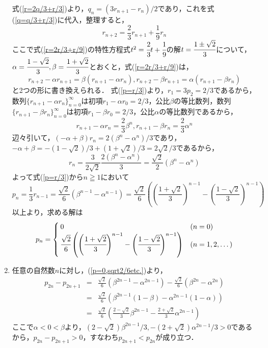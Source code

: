 \documentclass{jsarticle}
\begin{document}
\begin{enumerate}[(1)]
			式(\ref{r=2q/3+r/3})より，$q_n=(3r_{n+1}-r_n)/2$であり，これを式(\ref{q=q/3+r/3})に代入，整理すると，
			\begin{equation}
				\label{r=2r/3+r/9}
				r_{n+2}=\frac{2}{3}r_{n+1}+\frac{1}{9}r_n
			\end{equation}
			ここで式(\ref{r=2r/3+r/9})の特性方程式$t^2=\cfrac{2}{3}t+\cfrac{1}{9}$の解$t=\cfrac{1\pm \sqrt{2}}{3}$について，$\alpha=\cfrac{1-\sqrt{2}}{3},\beta=\cfrac{1+\sqrt{2}}{3}$とおくと，式(\ref{r=2r/3+r/9})は，
			\[
				r_{n+2}-\alpha r_{n+1}=\beta (r_{n+1}-\alpha r_n),
				r_{n+2}-\beta r_{n+1}=\alpha (r_{n+1}-\beta r_n)
			\]
			と2つの形に書き換えられる．
			式(\ref{p=r/3})より，$r_1=3p_2=2/3$であるから，数列$\{r_{n+1}-\alpha r_n\}_{n=0}^{\infty}$は初項$r_1-\alpha r_0=2/3$，公比$\beta$の等比数列，数列$\{r_{n+1}-\beta r_n\}_{n=0}^{\infty}$は初項$r_1-\beta r_0=2/3$，公比$\alpha$の等比数列であるから，
			\[
				r_{n+1}-\alpha r_n=\frac{2}{3}\beta^n,
				r_{n+1}-\beta r_n=\frac{2}{3}\alpha^n
			\]
			辺々引いて，$(-\alpha+\beta)r_n=2(\beta^n-\alpha^n)/3$であり，$-\alpha+\beta=-(1-\sqrt{2})/3+(1+\sqrt{2})/3=2\sqrt{2}/3$であるから，
			\[
				r_n=\frac{3}{2\sqrt{2}}\frac{2(\beta^n-\alpha^n)}{3}=\frac{\sqrt{2}}{2}(\beta^n-\alpha^n)
			\]
			よって式(\ref{p=r/3})から$n\geqq1$において
			\[
				p_n=\frac{1}{3}r_{n-1}
				=\frac{\sqrt{2}}{6}(\beta^{n-1}-\alpha^{n-1})
				=\frac{\sqrt{2}}{6}\left(\left(\frac{1+\sqrt{2}}{3}\right)^{n-1}-\left(\frac{1-\sqrt{2}}{3}\right)^{n-1}\right)
			\]
			以上より，求める解は
			\begin{equation}
				\label{p=0,sqrt2/6etc.}
			  p_n = \begin{cases}
			    0 & (n=0) \\
			    \cfrac{\sqrt{2}}{6}\left(\left(\cfrac{1+\sqrt{2}}{3}\right)^{n-1}-\left(\cfrac{1-\sqrt{2}}{3}\right)^{n-1}\right) & (n=1,2,\dots)
			  \end{cases}
			\end{equation}
\item 任意の自然数$n$に対し，(\ref{p=0,sqrt2/6etc.})より，
			\begin{eqnarray*}
				p_{2n}-p_{2n+1}&=&\frac{\sqrt{2}}{6}(\beta^{2n-1}-\alpha^{2n-1})-\frac{\sqrt{2}}{6}(\beta^{2n}-\alpha^{2n})\\
				&=&\frac{\sqrt{2}}{6}(\beta^{2n-1}(1-\beta)-\alpha^{2n-1}(1-\alpha))\\
				&=&\frac{\sqrt{2}}{6}\left(\frac{2-\sqrt{2}}{3}\beta^{2n-1}-\frac{2+\sqrt{2}}{3}\alpha^{2n-1}\right)
			\end{eqnarray*}
			ここで$\alpha<0<\beta$より，$(2-\sqrt{2})\beta^{2n-1}/3,-(2+\sqrt{2})\alpha^{2n-1}/3>0$であるから，$p_{2n}-p_{2n+1}>0$，すなわち$p_{2n+1}<p_{2n}$が成り立つ．
			

\end{enumerate}
\end{document}

